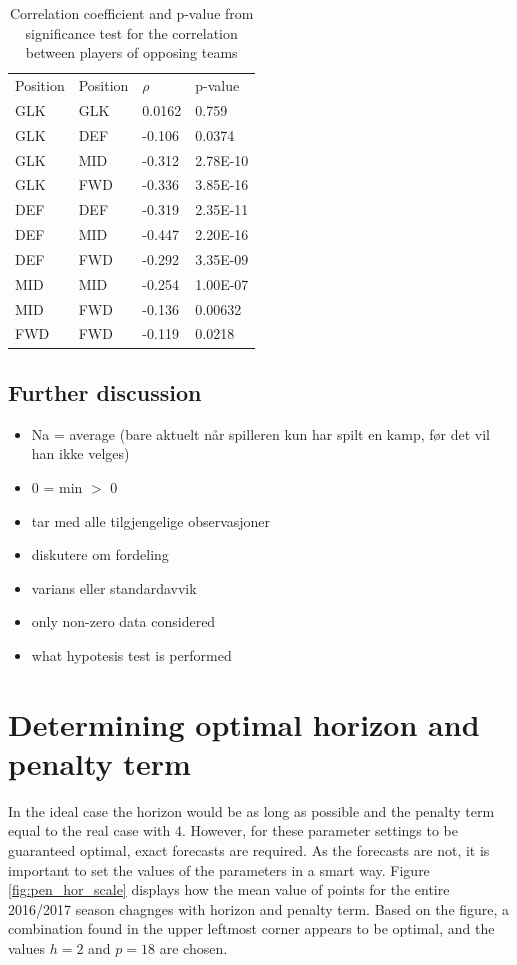 \begin{table}[H]
\centering
\caption{Correlation coefficient and p-value from significance test for the correlation between players of opposing teams}
\label{tab:cor_opp}
\begin{tabular}{llll}
Position & Position & $\rho$    & p-value  \\
GLK      & GLK      & 0.0162 & 0.759    \\
GLK      & DEF      & -0.106 & 0.0374   \\
GLK      & MID      & -0.312 & 2.78E-10 \\
GLK      & FWD      & -0.336 & 3.85E-16 \\
DEF      & DEF      & -0.319 & 2.35E-11 \\
DEF      & MID      & -0.447 & 2.20E-16 \\
DEF      & FWD      & -0.292 & 3.35E-09 \\
MID      & MID      & -0.254 & 1.00E-07 \\
MID      & FWD      & -0.136 & 0.00632 \\
FWD      & FWD      & -0.119 & 0.0218  
\end{tabular}
\end{table}

\subsection{Further discussion}
\begin{itemize}
    \item Na = average (bare aktuelt når spilleren kun har spilt en kamp, før det vil han ikke velges) 
    \item 0 = min $>$ 0
    \item tar med alle tilgjengelige observasjoner
    \item diskutere om fordeling
    \item varians eller standardavvik
    \item only non-zero data considered
    \item what hypotesis test is performed
\end{itemize}

\section{Determining optimal horizon and penalty term}

In the ideal case the horizon would be as long as possible and the penalty term equal to the real case with 4. However, for these parameter settings to be guaranteed optimal, exact forecasts are required. As the forecasts are not, it is important to set the values of the parameters in a smart way. Figure \ref{fig:pen_hor_scale} displays how the mean value of points for the entire 2016/2017 season chagnges with horizon and penalty term. Based on the figure, a combination found in the upper leftmost corner appears to be optimal, and the values $h = 2$ and $p = 18$ are chosen.

